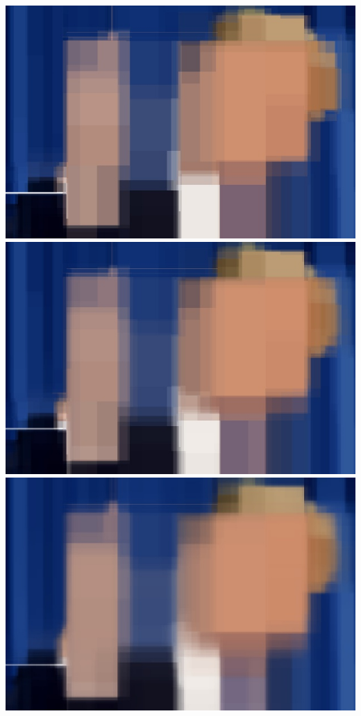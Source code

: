\documentclass[12pt]{article}
\begin{document}
{\includegraphics[scale=0.15]{P1/RF_Trump_depth7trees5.jpg}
\includegraphics[scale=0.15]{P1/RF_Trump_depth7trees10.jpg}
\includegraphics[scale=0.15]{P1/RF_Trump_depth7trees100.jpg}

}
\end{document}
